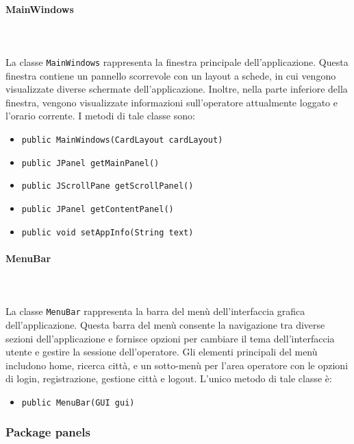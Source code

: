 \paragraph{MainWindows}\\
\\
La classe \texttt{MainWindows} rappresenta la finestra principale dell'applicazione.
Questa finestra contiene un pannello scorrevole con un layout a schede, in cui vengono visualizzate diverse schermate dell'applicazione. 
Inoltre, nella parte inferiore della finestra, vengono visualizzate informazioni sull'operatore attualmente loggato e l'orario corrente.
I metodi di tale classe sono:
\begin{itemize}
    \item \texttt{public MainWindows(CardLayout cardLayout)}
    \item \texttt{public JPanel getMainPanel()}
    \item \texttt{public JScrollPane getScrollPanel()}
    \item \texttt{public JPanel getContentPanel()}
    \item \texttt{public void setAppInfo(String text)}
\end{itemize}

\paragraph{MenuBar}\\
\\
La classe \texttt{MenuBar} rappresenta la barra del menù dell'interfaccia grafica dell'applicazione.
Questa barra del menù consente la navigazione tra diverse sezioni dell'applicazione e fornisce opzioni per cambiare il tema dell'interfaccia utente e gestire la sessione dell'operatore.
Gli elementi principali del menù includono home, ricerca città, e un sotto-menù per l'area operatore con le opzioni di login, registrazione, gestione città e logout.
L'unico metodo di tale classe è:
\begin{itemize}
    \item \texttt{public MenuBar(GUI gui)}
\end{itemize}

\subsubsection {Package panels}

